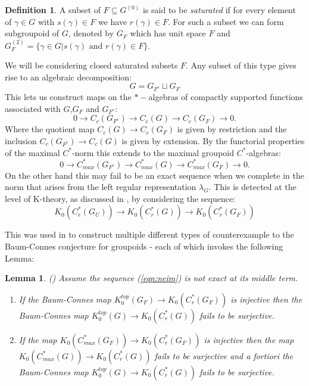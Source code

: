 \documentclass[11pt]{amsart}
\theoremstyle{plain}
\newtheorem{lemma}[theorem]{Lemma}%
\theoremstyle{definition}%
\newtheorem{definition}[theorem]{Definition}%
\theoremstyle{remark}%
\begin{document}
\begin{definition}
A subset of $F\subseteq G^{(0)}$ is said to be \textit{saturated} if for every element of $\gamma \in G$ with $s(\gamma) \in F$ we have $r(\gamma) \in F$. For such a subset we can form subgroupoid of $G$, denoted by $G_{F}$ which has unit space $F$ and $G_{F}^{(2)}=\lbrace \gamma \in G | s(\gamma) \mbox{ and } r(\gamma) \in F \rbrace$.
\end{definition}

We will be considering closed saturated subsets $F$. Any subset of this type gives rise to an algebraic decomposition:
\begin{equation*}
G = G_{F^{c}}\sqcup G_{F}
\end{equation*}
This lets us construct maps on the $*-$algebras of compactly supported functions associated with $G$,$G_{F}$ and $G_{F^{c}}$:
\begin{equation*}
0 \rightarrow C_{c}(G_{F^{c}}) \rightarrow C_{c}(G) \rightarrow C_{c}(G_{F}) \rightarrow 0.
\end{equation*}
Where the quotient map $C_{c}(G) \rightarrow C_{c}(G_{F})$ is given by restriction and the inclusion $C_{c}(G_{F^{c}}) \rightarrow C_{c}(G)$ is given by extension. By the functorial properties of the maximal $C^{*}$-norm this extends to the maximal groupoid $C^{*}$-algebras:
\begin{equation*}
0 \rightarrow C_{max}^{*}(G_{F^{c}}) \rightarrow C_{max}^{*}(G) \rightarrow C_{max}^{*}(G_{F}) \rightarrow 0.
\end{equation*}
On the other hand this may fail to be an exact sequence when we complete in the norm that arises from the left regular representation $\lambda_{G}$. This is detected at the level of K-theory, as discussed in \cite{MR1911663}, by considering the sequence:
\begin{equation}\label{eqn:neim}
K_{0}(C^{*}_{r}(G_{U}))\rightarrow K_{0}(C^{*}_{r}(G)) \rightarrow K_{0}(C^{*}_{r}(G_{F}))
\end{equation}

This was used in \cite{MR1911663} to construct multiple different types of counterexample to the Baum-Connes conjecture for groupoids - each of which invokes the following Lemma:
\begin{lemma}\label{Lem:Lemma1}(\cite[Lemma 1]{MR1911663})
Assume the sequence (\ref{eqn:neim}) is not exact at its middle term.
\begin{enumerate}
\item If the Baum-Connes map $K_{0}^{top}(G_{F}) \rightarrow K_{0}(C^{*}_{r}(G_{F}))$ is injective then the Baum-Connes map $K_{0}^{top}(G) \rightarrow K_{0}(C^{*}_{r}(G))$ fails to be surjective.
\item If the map $K_{0}(C^{*}_{max}(G_{F})) \rightarrow K_{0}(C^{*}_{r}(G_{F}))$ is injective then the map $K_{0}(C^{*}_{max}(G)) \rightarrow K_{0}(C^{*}_{r}(G))$ fails to be surjective and a fortiori the Baum-Connes map $K_{0}^{top}(G) \rightarrow K_{0}(C^{*}_{r}(G))$ fails to be surjective.
\end{enumerate}
\end{lemma}
\end{document}
